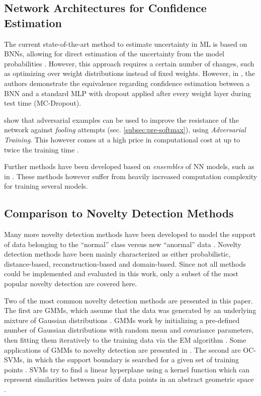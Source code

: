 \documentclass[10pt]{article}
\begin{document}
\subsection{Network Architectures for Confidence Estimation}
The current state-of-the-art method to estimate uncertainty in \gls{ML} is based on \glspl{BNN}, allowing for direct estimation of the uncertainty from the model probabilities \cite{Gal2015Dropout,ghahramani,KendallG17}. However, this approach requires a certain number of changes, such as optimizing over weight distributions instead of fixed weights. However, in \textcite{Gal2015Dropout, ghahramani}, the authors demonstrate the equivalence regarding confidence estimation between a \gls{BNN} and a standard \gls{MLP} with dropout applied after every weight layer during test time (\gls{MC-Dropout}).

\textcite{Goodfellow2014} show that adversarial examples can be used to improve the resistance of the network against \textit{fooling} attempts (sec. \ref{subsec:pre-softmax}), using \textit{Adversarial Training}. This however comes at a high price in computational cost at up to twice the training time \cite{mandelbaum17}.

Further methods have been developed based on \textit{ensembles} of NN models, such as in \textcite{Lakshminarayanan16, mandelbaum17}. These methods however suffer from heavily increased computation complexity for training several models.

\subsection{Comparison to Novelty Detection Methods}
Many more novelty detection methods have been developed to model the support of data belonging to the ``normal'' class versus new ``anormal'' data \cite{Pimentel2014ARO, Markou2003NoveltyDApt1, Markou2003NoveltyDApt2}. Novelty detection methods have been mainly characterized as either probabilistic, distance-based, reconstruction-based and domain-based. Since not all methods could be implemented and evaluated in this work, only a subset of the most popular novelty detection are covered here. 

Two of the most common novelty detection methods are presented in this paper. The first are \glspl{GMM}, which assume that the data was generated by an underlying mixture of Gaussian distributions \cite{Reynolds2009GaussianMM}. \glspl{GMM} work by initializing a pre-defined number of Gaussian distributions with random mean and covariance parameters, then fitting them iteratively to the training data via the \gls{EM} algorithm \cite{Dempster1977MaximumLF}. Some applications of \glspl{GMM} to novelty detection are presented in \cite{Pimentel2014ARO}. The second are \glspl{OC-SVM}, in which the support boundary is searched for a given set of training points \cite{Wang2004AnomalyID, Beghi2014AOS}. \glspl{SVM} try to find a linear hyperplane using a kernel function which can represent similarities between pairs of data points in an abstract geometric space \cite{Szymanski2011VisualisingKS}.
\end{document}
